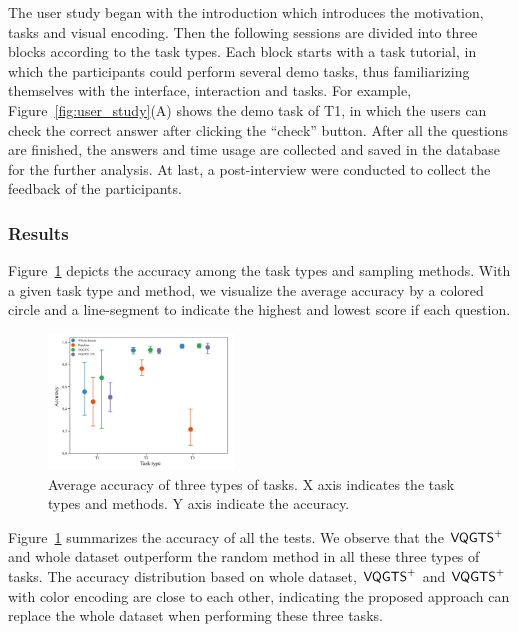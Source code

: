 The user study began with the introduction which introduces the motivation, tasks and visual encoding. Then the following sessions are divided into three blocks according to the task types. Each block starts with a task tutorial, in which the participants could perform several demo tasks, thus familiarizing themselves with the interface, interaction and tasks. For example, Figure~\ref{fig:user_study}(A) shows the demo task of T1, in which the users can check the correct answer after clicking the ``check'' button. After all the questions are finished, the answers and time usage are collected and saved in the database for the further analysis. At last, a post-interview were conducted to collect the feedback of the participants.  


\subsubsection{Results}
Figure~\ref{fig:accuracy} depicts the accuracy among the task types and sampling methods. With a given task type and method, we visualize the average accuracy by a colored circle and a line-segment to indicate the highest and lowest score if each question. 

\begin{figure}[t]
	\centering
	\includegraphics[width=0.44\textwidth]{pictures/user_study/accuracy.pdf}
	\vspace{-3mm}
	\caption{Average accuracy of three types of tasks. X axis indicates the task types and methods. Y axis indicate the accuracy.}
	\vspace{-5mm}
	\label{fig:accuracy}
\end{figure}

Figure~\ref{fig:accuracy} summarizes the accuracy of all the tests. We observe that the $\mathsf{VQGTS}^{+}$ and whole dataset outperform the random method in all these three types of tasks. The accuracy distribution based on whole dataset, $\mathsf{VQGTS}^{+}$ and $\mathsf{VQGTS}^{+}$ with color encoding are close to each other, indicating the proposed approach can replace the whole dataset when performing these three tasks. 




